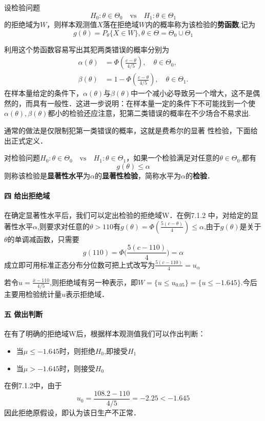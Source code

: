 \begin{definition}
    设检验问题
    $$
        H_0:\theta\in\Theta_0\quad\mathrm{vs}\quad H_1:\theta\in\Theta_1
    $$
    的拒绝域为$W$，则样本观测值$X$落在拒绝域$W$内的概率称为该检验的\textbf{势函数},记为
    $$
        g(\theta)=P_{\theta}\{X\in W\},\theta\in\Theta=\Theta_0\cup\Theta_1
    $$
\end{definition}
利用这个势函数容易写出其犯两类错误的概率分别为
\begin{equation}
    \begin{aligned}
        \alpha\left(\theta\right) & =\Phi{\left(\frac{c-\theta}{4/5}\right)},\quad\theta\in\Theta_0, \\\beta{\left(\theta\right)}&=1-\Phi{\left(\frac{c-\theta}{4/5}\right)},\quad\theta\in\Theta_1.
    \end{aligned}
\end{equation}
在样本量给定的条件下，$\alpha(\theta)$与$\beta(\theta)$中一个减小必导致另一个增大，这不是偶然的，而具有一般性．这进一步说明：在样本量一定的条件下不可能找到一个使$\alpha(\theta),\beta(\theta)$都小的检验还应注意，犯第二类错误的概率在不少场合不易求出.

通常的做法是仅限制犯第一类错误的概率，这就是费希尔的显著
性检验，下面给出正式定义．
\begin{definition}
    对检验问题$H_0:\theta\in\Theta_0\quad\mathrm{vs}\quad H_1:\theta\in\Theta_1$，如果一个检验满足对任意的$\theta \in \Theta_0 $,都有
    $$
        g(\theta) \le \alpha
    $$
    则称该检验是\textbf{显著性水平}为$\alpha$的\textbf{显著性检验}，简称水平为$\alpha$的\textbf{检验}．
\end{definition}

\paragraph{四 \quad 给出拒绝域}
在确定显著性水平后，我们可以定出检验的拒绝域W．在例7.1.2 中，对给定的显著性水平$\alpha$,则要求对任意的$\theta>110$有$g(\theta)=\Phi\left( \frac{5(c-\theta)}{4} \right)\leqslant\alpha $,由于$g(\theta)$是关于$\theta$的单调减函数，只需要
$$g\left(110\right)=\Phi\Big(\frac{5\left(c-110\right)}{4}\Big)=\alpha $$成立即可用标准正态分布分位数可把上式改写为$\frac{5(c-110)}{4}=u_{\alpha}$

若令$u=\frac{\overline{x}-110}{4/5}$,则拒绝域有另一种表示，即$W=\{u\leqslant u_{0.05}\}=\{u\leqslant-1.645\}.$今后主要用检验统计量$u$表示拒绝域．
\paragraph{五 \quad 做出判断}
在有了明确的拒绝域W后，根据样本观测值我们可以作出判断：
\begin{itemize}
    \item 当$\mu \leq -1.645$时，则拒绝$H_0$,即接受$H_1$
    \item 当$\mu > -1.645$时，则接受$H_0$
\end{itemize}
在例7.1.2中，由于
$$u_0=\frac{108.2-110}{4/5}=-2.25<-1.645$$
因此拒绝原假设，即认为该日生产不正常．

